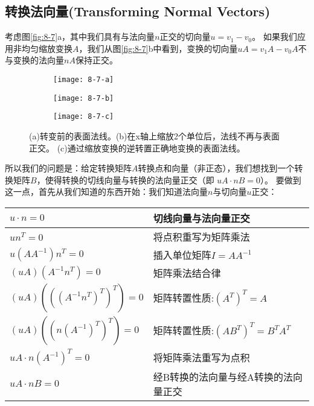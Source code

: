 \subsection{转换法向量(Transforming Normal Vectors)}
\begin{flushleft}
考虑图\ref{fig:8-7}a，其中我们具有与法向量$n$正交的切向量$u=v_{1}-v_{0}$。 如果我们应用非均匀缩放变换$A$，我们从图\ref{fig:8-7}b中看到，变换的切向量$uA=v_{1}A-v_{0}A$不与变换的法向量$nA$保持正交。
\end{flushleft}

\begin{figure}
\label{fig:8-7}
\begin{subfigure}{1\textwidth}
  \centering
  \texttt{[image: 8-7-a]}
\end{subfigure}
\begin{subfigure}{1\textwidth}
  \centering
  \texttt{[image: 8-7-b]}
\end{subfigure}
\begin{subfigure}{1\textwidth}
  \centering
  \texttt{[image: 8-7-c]}
\end{subfigure}
\caption{(a)转变前的表面法线。(b)在x轴上缩放2个单位后，法线不再与表面正交。 (c)通过缩放变换的逆转置正确地变换的表面法线。}
\end{figure}

\begin{flushleft}
所以我们的问题是：给定转换矩阵$A$转换点和向量（非正态），我们想找到一个转换矩阵$B$，使得转换的切线向量与转换的法向量正交（即 $uA\cdot nB = 0$）。 要做到这一点，首先从我们知道的东西开始：我们知道法向量$n$与切向量$u$正交：\\
\end{flushleft}

\begin{tabular}{|p{5em}|p{35em}|} 
\hline
$u\cdot n=0$ & 切线向量与法向量正交\\ 
\hline
$un^{T}=0$ & 将点积重写为矩阵乘法\\ 
\hline
$u(AA^{-1})n^{T}=0$ & 插入单位矩阵$I=AA^{-1}$\\
\hline 
$(uA)(A^{-1}n^{T})=0$ & 矩阵乘法结合律\\
\hline 
$(uA)(((A^{-1}n^{T})^{T})^{T})=0$ & 矩阵转置性质:$(A^{T})^{T}=A$\\
\hline 
$(uA)((n(A^{-1})^{T})^{T})=0$ & 矩阵转置性质:$(AB^{T})^{T}=B^{T}A^{T}$\\
\hline 
$uA\cdot n(A^{-1})^{T}=0$ & 将矩阵乘法重写为点积\\ 
\hline
$uA\cdot nB=0$ & 经B转换的法向量与经A转换的法向量正交\\ 
\hline
\end{tabular}


